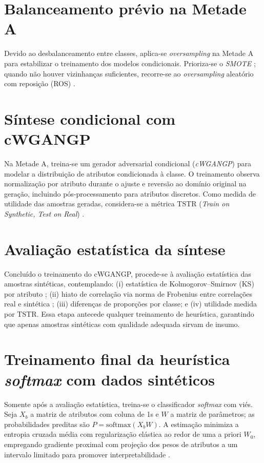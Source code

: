 \documentclass[12pt,a4paper]{report}
\begin{document}
\section{Balanceamento prévio na Metade A}
Devido ao desbalanceamento entre classes, aplica-se \emph{oversampling} na Metade A para estabilizar o treinamento dos modelos condicionais. Prioriza-se o \emph{SMOTE} \cite{Chawla2002SMOTE}; quando não houver vizinhanças suficientes, recorre-se ao \emph{oversampling} aleatório com reposição (ROS) \cite{He2009Imbalance}.

\section{Síntese condicional com cWGAN\textendash GP}
Na Metade A, treina-se um gerador adversarial condicional (\emph{cWGAN\textendash GP}) \cite{Arjovsky2017WGAN,Gulrajani2017ImprovedWGAN} para modelar a distribuição de atributos condicionada à classe. O treinamento observa normalização por atributo durante o ajuste e reversão ao domínio original na geração, incluindo pós-processamento para atributos discretos. Como medida de utilidade das amostras geradas, considera-se a métrica \textsc{TSTR} (\emph{Train on Synthetic, Test on Real}) \cite{Yoon2019TimeGAN,Esteban2017RGAN}.

\section{Avaliação estatística da síntese}
Concluído o treinamento do cWGAN\textendash GP, procede-se à avaliação estatística das amostras sintéticas, contemplando: (i) estatística de Kolmogorov--Smirnov (KS) por atributo \cite{Massey1951KS}; (ii) hiato de correlação via norma de Frobenius entre correlações real e sintética \cite{Golub2013Matrix}; (iii) diferenças de proporções por classe; e (iv) utilidade medida por \textsc{TSTR}. Essa etapa antecede qualquer treinamento de heurística, garantindo que apenas amostras sintéticas com qualidade adequada sirvam de insumo.

\section{Treinamento final da heurística \emph{softmax} com dados sintéticos}
Somente após a avaliação estatística, treina-se o classificador \emph{softmax} com viés. Seja $X_b$ a matriz de atributos com coluna de 1s e $W$ a matriz de parâmetros; as probabilidades preditas são $P=\mathrm{softmax}(X_bW)$. A estimação minimiza a entropia cruzada média com regularização elástica ao redor de uma a priori $W_0$, empregando gradiente proximal com projeção dos pesos de atributos a um intervalo limitado para promover interpretabilidade \cite{Bishop2006PRML,Parikh2014Proximal}.
\end{document}
